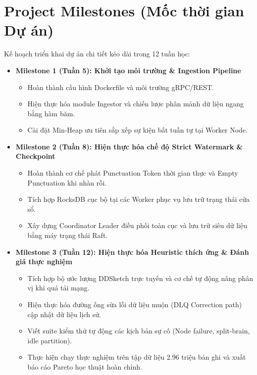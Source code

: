 \documentclass[12pt,a4paper]{article}
\begin{document}
\section{Project Milestones (Mốc thời gian Dự án)}
Kế hoạch triển khai dự án chi tiết kéo dài trong 12 tuần học:
\begin{itemize}[leftmargin=*]
    \item \textbf{Milestone 1 (Tuần 5): Khởi tạo môi trường \& Ingestion Pipeline}
    \begin{itemize}[label={-}]
        \item Hoàn thành cấu hình Dockerfile và môi trường gRPC/REST.
        \item Hiện thực hóa module Ingestor và chiến lược phân mảnh dữ liệu ngang bằng hàm băm.
        \item Cài đặt Min-Heap ưu tiên sắp xếp sự kiện bất tuần tự tại Worker Node.
    \end{itemize}
    \item \textbf{Milestone 2 (Tuần 8): Hiện thực hóa chế độ Strict Watermark \& Checkpoint}
    \begin{itemize}[label={-}]
        \item Hoàn thành cơ chế phát Punctuation Token thời gian thực và Empty Punctuation khi nhàn rỗi.
        \item Tích hợp RocksDB cục bộ tại các Worker phục vụ lưu trữ trạng thái cửa sổ.
        \item Xây dựng Coordinator Leader điều phối toàn cục và lưu trữ siêu dữ liệu bằng máy trạng thái Raft.
    \end{itemize}
    \item \textbf{Milestone 3 (Tuần 12): Hiện thực hóa Heuristic thích ứng \& Đánh giá thực nghiệm}
    \begin{itemize}[label={-}]
        \item Tích hợp bộ ước lượng DDSketch trực tuyến và cơ chế tự động nâng phân vị khi quá tải mạng.
        \item Hiện thực hóa đường ống sửa lỗi dữ liệu muộn (DLQ Correction path) cập nhật dữ liệu lịch sử.
        \item Viết suite kiểm thử tự động các kịch bản sự cố (Node failure, split-brain, idle partition).
        \item Thực hiện chạy thực nghiệm trên tập dữ liệu 2.96 triệu bản ghi và xuất báo cáo Pareto học thuật hoàn chỉnh.
    \end{itemize}
\end{itemize}
\end{document}
